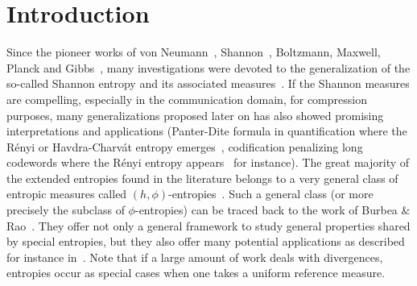 \documentclass[entropy,article,submit,moreauthors,pdftex]{Definitions/mdpi}
\begin{document}

\section{Introduction}
\label{sec:Intro}

Since  the pioneer  works  of  von Neumann~\cite{vNeu27},  Shannon~\cite{Sha48},
Boltzmann, Maxwell, Planck and Gibbs~\cite{Bol64, Bol96, Bol98, Pla15, Nie52:v2,
  Jay65, MulMul09},  many investigations were  devoted to the  generalization of
the so-called  Shannon entropy  and its associated  measures~\cite{Ren61, Var66,
  HavCha67,  Csi67, Dar70,  AczDar75, DarJar79,  Tsa88, Sal87,  SalMen93, Sal94,
  LieVaj06, Bas13}.  If  the Shannon measures are compelling,  especially in the
communication domain,  for compression  purposes, many  generalizations proposed
later on has also showed promising interpretations and applications (Panter-Dite
formula  in  quantification  where   the  R\'enyi  or  Havdra-Charv\'at  entropy
emerges~\cite{PanDit51, Llo82, GerGra92}, codification penalizing long codewords
where the R\'enyi entropy appears~\cite{Cam65,  Ber09} for instance).  The great
majority of  the extended entropies  found in the  literature belongs to  a very
general  class  of  entropic measures  called  $(h,\phi)$-entropies~\cite{Csi67,
  BurRao82, SalMen93,  Sal94, MenMor97, Par06}.   Such a general class  (or more
precisely the  subclass of $\phi$-entropies) can  be traced back to  the work of
Burbea \& Rao~\cite{BurRao82}. They offer not  only a general framework to study
general  properties  shared by  special  entropies,  but  they also  offer  many
potential applications as described for  instance in~\cite{Par06}.  Note that if
a large amount of work deals  with divergences, entropies occur as special cases
when one takes a uniform reference measure.
\end{document}

